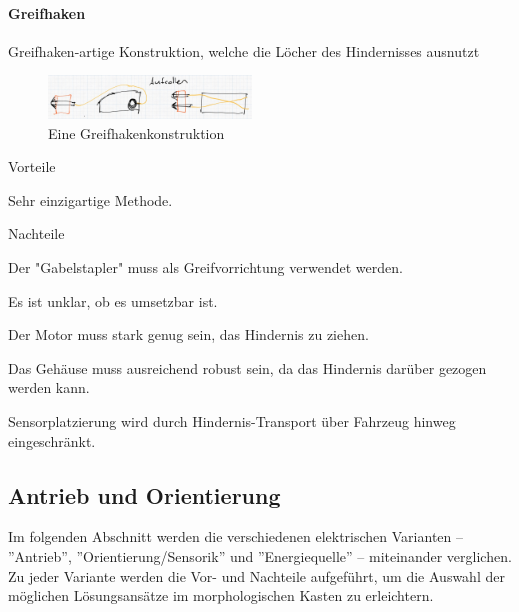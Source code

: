 \documentclass[../main.tex]{subfiles}
\begin{document}
\paragraph{Greifhaken}
Greifhaken-artige Konstruktion, welche die Löcher des Hindernisses ausnutzt

\begin{figure}[h!]
        \centering
        \includegraphics[width=0.48\textwidth]{img/technologierecherche/Rotation/harponne.jpg}
        \caption{Eine Greifhakenkonstruktion}
        \label{img:tech_harponne}
\end{figure}

\begin{minipage}[t]{0.48\textwidth}
    \begin{items}
          \item [Vorteile]
          \item Sehr einzigartige Methode.
    \end{items}
\end{minipage}
\hfill
\begin{minipage}[t]{0.48\textwidth}
    \begin{items}
          \item [Nachteile]
          \item Der "Gabelstapler" muss als Greifvorrichtung verwendet werden.
          \item Es ist unklar, ob es umsetzbar ist.
          \item Der Motor muss stark genug sein, das Hindernis zu ziehen.
          \item Das Gehäuse muss ausreichend robust sein, da das Hindernis darüber gezogen werden kann.
          \item Sensorplatzierung wird durch Hindernis-Transport über Fahrzeug hinweg eingeschränkt.
    \end{items}
\end{minipage}
\newpage
\subsection{Antrieb und Orientierung}
\label{a2:Antrieb_Orientierung}
Im folgenden Abschnitt werden die verschiedenen elektrischen Varianten – ''Antrieb'', ''Orientierung/Sensorik'' und ''Energiequelle'' – miteinander verglichen. Zu jeder Variante werden die Vor- und Nachteile aufgeführt, um die Auswahl der möglichen Lösungsansätze im morphologischen Kasten zu erleichtern.
\end{document}
